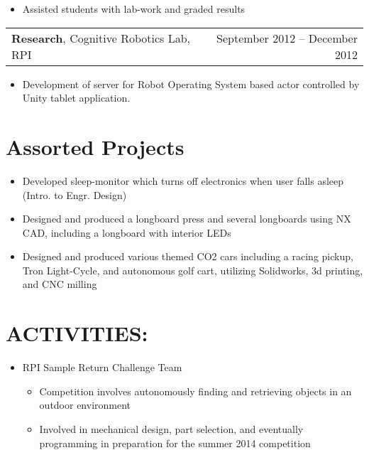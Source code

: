 \documentclass[margin]{res}
\begin{document}
\begin{resume}
\begin{tabular}{p{4in} r}
	\end{tabular}
	\begin{itemize}
		\item Assisted students with lab-work and graded results
 	\end{itemize}
	\vspace{-1.5mm}
	\begin{tabular}{p{4in} r}
		{\bf Research}, Cognitive Robotics Lab, RPI		& September 2012 -- December 2012
	\end{tabular}
	\begin{itemize}
		\item Development of server for Robot Operating System based actor
			controlled by Unity tablet application.
	\end{itemize}
\vspace{-1.5mm}

\normalsize{\section{Assorted Projects}}
\begin{itemize}
  \item Developed sleep-monitor which turns off electronics when user falls asleep (Intro. to Engr. Design)
  \item Designed and produced a longboard press and several longboards using NX CAD, including a longboard
        with interior LEDs
  \item Designed and produced various themed CO2 cars including a racing pickup, Tron Light-Cycle,
        and autonomous golf cart, utilizing Solidworks, 3d printing, and CNC milling
\end{itemize}
\vspace{-1.5mm}

\section{ACTIVITIES:}
	\begin{itemize}
    \item RPI Sample Return Challenge Team
    \begin{itemize}
      \item Competition involves autonomously finding and retrieving objects in an outdoor environment
      \item Involved in mechanical design, part selection, and eventually programming in preparation for the summer 2014 competition
    \end{itemize}
	\end{itemize}
\end{resume} 
\end{document}
